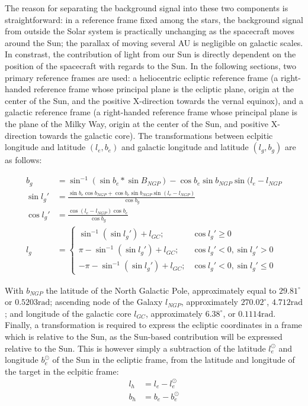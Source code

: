 The reason for separating the background signal into these two components is straightforward: in a reference frame fixed among the stars, the background signal from outside the Solar system is practically unchanging as the spacecraft moves around the Sun; the parallax of moving several AU is negligible on galactic scales. In constrast, the contribution of light from our Sun is directly dependent on the position of the spacecraft with regards to the Sun. In the following sections, two primary reference frames are used: a heliocentric ecliptic reference frame (a right-handed reference frame whose principal plane is the ecliptic plane, origin at the center of the Sun, and the positive X-direction towards the vernal equinox), and a galactic reference frame (a right-handed reference frame whose principal plane is the plane of the Milky Way, origin at the center of the Sun, and positive X-direction towards the galactic core). The transformations between eclpitic longitude and latitude $(l_e, b_e)$ and galactic longitude and latitude $(l_g, b_g)$ are as follows:

\begin{align}
 b_g &= \sin ^{-1} (\sin b_e * \sin B_{NGP}) - \cos b_e \sin b_{NGP} \sin (l_e - l_{NGP} \\
 \sin l_g' &= \frac{\sin b_e \cos b_{NGP} + \cos b_e \sin b_{NGP} \sin (l_e - l_{NGP})}{\cos b_g} \\
 \cos l_g' &= \frac{\cos (l_e - l_{NGP}) \cos b_e}{\cos b_g} \\
 l_g &= \begin{cases}
        \sin ^{-1} (\sin l_g') + l_{GC}; & \cos l_g' \geq 0 \\
        \pi - \sin^{-1} (\sin l_g') + l_{GC}; & \cos l_g' < 0, \sin l_g' > 0 \\
        - \pi - \sin^{-1} (\sin l_g') + l_{GC}; & \cos l_g' < 0, \sin l_g' \leq 0
       \end{cases}
\end{align}

With $b_{NGP}$ the latitude of the North Galactic Pole, approximately equal to $29.81^\circ$ or $0.5203 \mathrm{rad}$; ascending node of the Galaxy $l_{NGP}$, approximately $270.02^\circ$, $4.712 \mathrm{rad}$; and longitude of the galactic core $l_{GC}$, approximately $6.38^\circ$, or $0.1114 \mathrm{rad}$. Finally, a transformation is required to express the ecliptic coordinates in a frame which is relative to the Sun, as the Sun-based contribution will be expressed relative to the Sun. This is however simply a subtraction of the latitude $l_e^\odot$ and longitude $b_e^\odot$ of the Sun in the ecliptic frame, from the latitude and longitude of the target in the eclpitic frame:
\begin{align}
 l_h &= l_e - l_e^\odot \\
 b_h &= b_e - b_e^\odot
\end{align}

